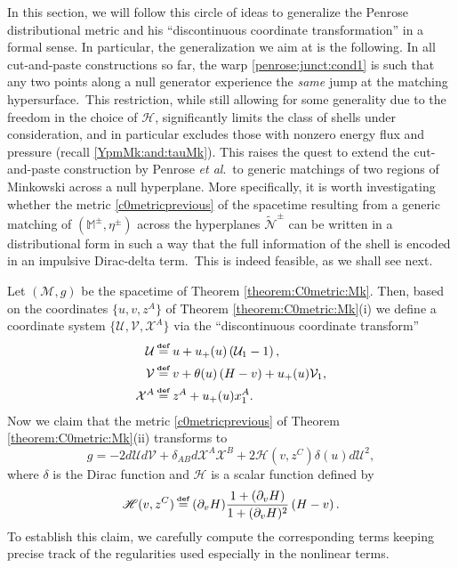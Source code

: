 \documentclass[11pt]{article}
\numberwithin{equation}{section}
\def\Mkpm{\mathbb{M}^{\pm}}
\def\flatpm{\eta^{\pm}}
\newcommand{\cx}{\mathcal{X}}
\newcommand{\heav}{\theta(u)}
\newcommand{\up}{u_{+}(u)}
\def\defi{{\stackrel{\mbox{\tiny {\textbf{def}}}}{\,\, = \,\, }}}
\newcommand\N{\mathcal N}
\def\defi{{\stackrel{\mbox{\tiny \textup{\textbf{def}}}}{\,\, = \,\, }}}
\newcommand{\cp}{\partial}
\newcommand{\lp}{\left(}
\newcommand{\rp}{\right)}
\newcommand{\cu}{\mathcal{U}}
\newcommand{\cv}{\mathcal{V}}
\newcommand{\tcte}{}%
\newcommand{\nullhyp}{\widetilde{\N}}
\newcommand{\hor}{\mathscr{H}}
\begin{document}
In this section, we will follow this circle of ideas to generalize the Penrose distributional metric and his ``discontinuous coordinate transformation'' in a formal sense. In particular, the generalization we aim at is the following. In all cut-and-paste constructions so far, the warp \eqref{penrose:junct:cond1} is such that any two points along a null generator experience the \textit{same} jump at the matching hypersurface.\ This restriction, while still allowing for some generality due to the freedom in the choice of $\mathcal{H}$, significantly limits the class of shells under consideration, and in particular excludes those with nonzero energy flux and pressure (recall \eqref{YpmMk:and:tauMk}). This raises the quest to extend the cut-and-paste construction by Penrose \textit{et al}.\ to generic matchings of two regions of Minkowski across a null hyperplane. More specifically, it is worth investigating whether the metric 
\eqref{c0metricprevious} of the spacetime resulting from a generic matching of $(\Mkpm,\flatpm)$ across the hyperplanes $\nullhyp^{\pm}$ can be written in a distributional form in such a way that the full information of the shell is encoded in an impulsive Dirac-delta term.\ This is indeed feasible, as we shall see next. 

Let $\lp\mathcal{M},g\rp$ be the spacetime of Theorem \ref{theorem:C0metric:Mk}. Then, based on the coordinates $\{u,v,z^A\}$ of Theorem \ref{theorem:C0metric:Mk}(i) we define a coordinate system $\{\cu,\cv,\cx^A\}$  via the ``discontinuous coordinate transform''
\begin{align}
	\label{disc:coord:transf:u} \cu&\defi u+\up\lp \cu_1-1\rp,\\ 
	\label{disc:coord:transf:v}\cv&\defi v+\heav\lp H-v\rp+\up\cv_1,\\ 
	\label{disc:coord:transf:x} \cx^A&\defi z^A+\up x_1^A.
\end{align}
Now we claim that the metric \eqref{c0metricprevious} of Theorem \ref{theorem:C0metric:Mk}(ii) transforms to
\begin{equation}
	\label{metric:distributional:Mk}
	g=-2d\cu d\cv+\delta_{AB}d\cx^A \cx^B+2\tcte{\hor(v,z^C)\delta(u)} d\cu^2,
\end{equation}
where $\delta$ is the Dirac function and $\hor$ is a scalar function defined by 
\begin{equation}
\label{def:hor}\hor(v,z^C)\defi (\cp_vH)\frac{1+(\cp_vH)}{1+(\cp_vH)^2}\lp H-v\rp. 
\end{equation}
To establish this claim, we carefully compute the corresponding terms keeping precise track of the regularities used especially in the nonlinear terms.  
\end{document}
